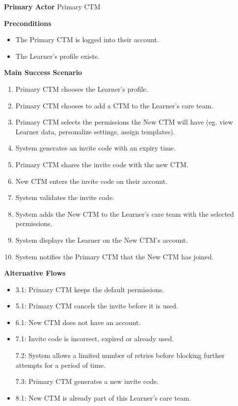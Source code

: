 \documentclass[12pt]{article}
\begin{document}
\textbf{Primary Actor}
Primary CTM

\textbf{Preconditions}
\begin{itemize}
\item The Primary CTM is logged into their account.
\item The Learner's profile exists.
\end{itemize}

\textbf{Main Success Scenario}
\begin{enumerate}
\item Primary CTM chooses the Learner's profile.
\item Primary CTM chooses to add a CTM to the Learner's care team.
\item Primary CTM selects the permissions the New CTM will have (eg. view Learner data, personalize settings, assign templates).
\item System generates an invite code with an expiry time.
\item Primary CTM shares the invite code with the new CTM.
\item New CTM enters the invite code on their account.
\item System validates the invite code.
\item System adds the New CTM to the Learner's care team with the selected permissions.
\item System displays the Learner on the New CTM's account.
\item System notifies the Primary CTM that the New CTM has joined.
\end{enumerate}

\textbf{Alternative Flows}
\begin{itemize}
\item 3.1: Primary CTM keeps the default permissions.

\item 5.1: Primary CTM cancels the invite before it is used.

\item 6.1: New CTM does not have an account.

\item 7.1: Invite code is incorrect, expired or already used.

7.2: System allows a limited number of retries before blocking further attempts for a period of time.

7.3: Primary CTM generates a new invite code.

\item 8.1: New CTM is already part of this Learner's care team.
\end{itemize}
\end{document}
